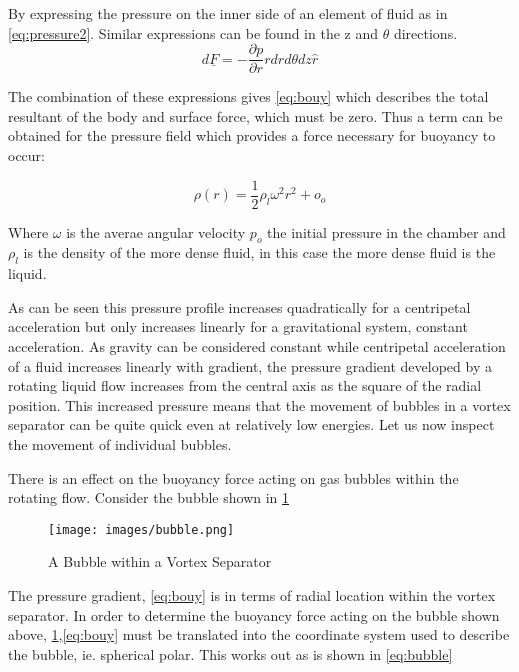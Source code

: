 \documentclass[12pt]{article}
\begin{document}
By expressing the pressure on the inner side of an element of fluid as in \cref{eq:pressure2}. Similar expressions can be found in the z and $\theta$ directions.
\begin{equation}
d\underline{F}=-\frac{\partial p}{\partial r}r drd\theta{}dz\hat{r}
\label{eq:surface_force}
\end{equation}

The combination of these expressions gives \cref{eq:bouy} which describes the total resultant of the body and surface force, which must be zero. Thus a term can be obtained for the pressure field which provides a force necessary for buoyancy to occur:

\begin{equation}
\rho(r)=\frac{1}{2}\rho_l \omega^2 r^2 + o_o
\label{eq:bouy}
\end{equation}

Where $\omega$ is the averae angular velocity $p_o$ the initial pressure in the chamber and $\rho_l$ is the density of the more dense fluid, in this case the more dense fluid is the liquid.

As can be seen this pressure profile increases quadratically for a centripetal acceleration but only increases linearly for a gravitational system, constant acceleration. As gravity can be considered constant while centripetal acceleration of a fluid increases linearly with gradient, the pressure gradient developed by a rotating liquid flow increases from the central axis as the square of the radial position. This increased pressure means that the movement of bubbles in a vortex separator can be quite quick even at relatively low energies. Let us now inspect the movement of individual bubbles.

There is an effect on the buoyancy force acting on gas bubbles within the rotating flow. Consider the bubble shown in \cref{fig:bubble}

\begin{figure}[ht]
\centering
\texttt{[image: images/bubble.png]}
\caption{A Bubble within a Vortex Separator}
\label{fig:bubble}
\end{figure}

The pressure gradient, \cref{eq:bouy} is in terms of radial location within the vortex separator. In order to determine the buoyancy force acting on the bubble shown above, \cref{fig:bubble},\cref{eq:bouy} must be translated into the coordinate system used to describe the bubble, ie. spherical polar. This works out as is shown in \cref{eq:bubble}
\end{document}
